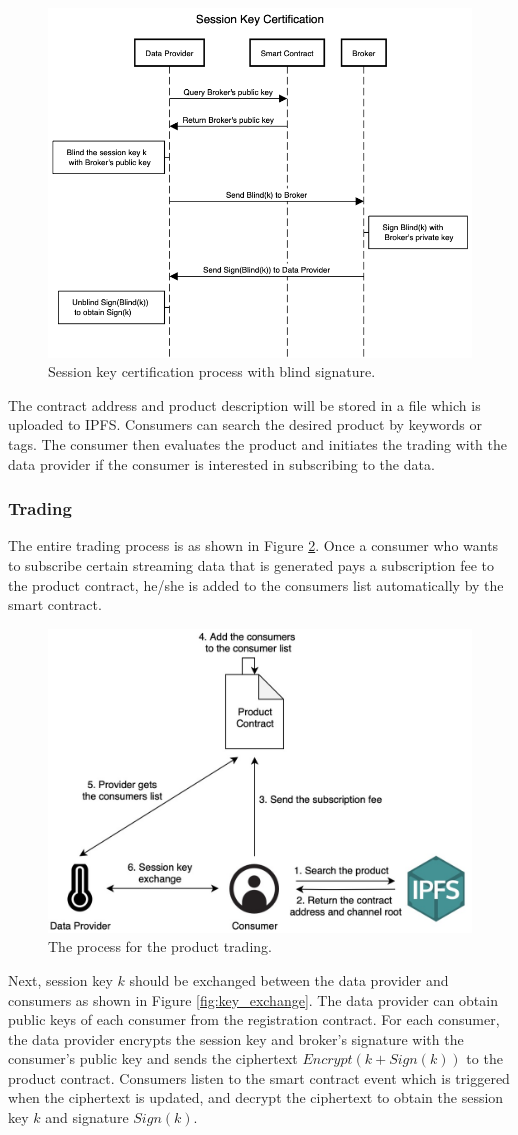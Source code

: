 \documentclass[journal,article,submit,moreauthors,pdftex]{Definitions/mdpi}
\begin{document}
\begin{figure}[H]
    \centering
    \includegraphics[width=3.3 in]{key_certification}
    \caption{Session key certification process with blind signature.}
    \label{fig:key_certification}
\end{figure}

The contract address and product description will be stored in a file which is uploaded to IPFS. Consumers can search the desired product by keywords or tags. The consumer then evaluates the product and initiates the trading with the data provider if the consumer is interested in subscribing to the data.

\subsubsection{Trading}
The entire trading process is as shown in Figure \ref{fig:trading_product}. Once a consumer who wants to subscribe certain streaming data that is generated  pays a subscription fee to the product contract, he/she is added to the consumers list automatically by the smart contract.

\begin{figure}[H]
    \centering
    \includegraphics[width=2 cm]{trading_product}
    \caption{The process for the product trading.}
    \label{fig:trading_product}
\end{figure}

Next, session key $k$ should be exchanged between the data provider and consumers as shown in Figure \ref{fig:key_exchange}. The data provider can obtain public keys of each consumer from the registration contract. For each consumer, the data provider encrypts the session key and broker's signature with the consumer's public key and sends the ciphertext $Encrypt(k + Sign(k))$ to the product contract. Consumers listen to the smart contract event which is triggered when the ciphertext is updated, and decrypt the ciphertext to obtain the session key $k$ and signature $Sign(k)$.
\end{document}
